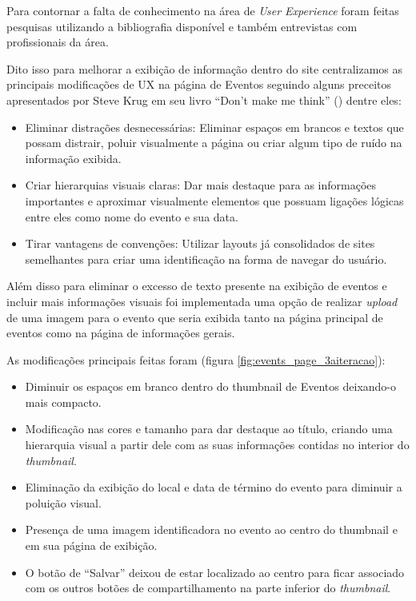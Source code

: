 \par Para contornar a falta de conhecimento na área de \emph{User Experience} foram feitas pesquisas utilizando a bibliografia disponível e também entrevistas com profissionais da área.
	\par Dito isso para melhorar a exibição de informação dentro do site centralizamos as principais modificações de UX na página de Eventos seguindo alguns preceitos apresentados por Steve Krug em seu livro ``Don't make me think'' (\cite{krug:00}) dentre eles:
	\begin{itemize}
	\item Eliminar distrações desnecessárias: Eliminar espaços em brancos e textos que possam distrair, poluir visualmente a página ou criar algum tipo de ruído na informação exibida.
	\item Criar hierarquias visuais claras: Dar mais destaque para as informações importantes e aproximar visualmente elementos que possuam ligações lógicas entre eles como nome do evento e sua data.
	\item Tirar vantagens de convenções: Utilizar layouts já consolidados de sites semelhantes para criar uma identificação na forma de navegar do usuário.
\end{itemize}
	\par Além disso para eliminar o excesso de texto presente na exibição de eventos e incluir mais informações visuais foi implementada uma opção de realizar \emph{upload} de uma imagem para o evento que seria exibida tanto na página principal de eventos como na página de informações gerais.
\par As modificações principais feitas foram (figura \ref{fig:events_page_3aiteracao}):
\begin{itemize}
\item Diminuir os espaços em branco dentro do thumbnail de Eventos deixando-o mais compacto.
\item Modificação nas cores e tamanho para dar destaque ao título, criando uma hierarquia visual a partir dele com as suas informações contidas no interior do \emph{thumbnail}.
\item Eliminação da exibição do local e data de término do evento para diminuir a poluição visual.
\item Presença de uma imagem identificadora no evento ao centro do thumbnail e em sua página de exibição.
\item O botão de “Salvar” deixou de estar localizado ao centro para ficar associado com os outros botões de compartilhamento na parte inferior do \emph{thumbnail}.
\end{itemize}
